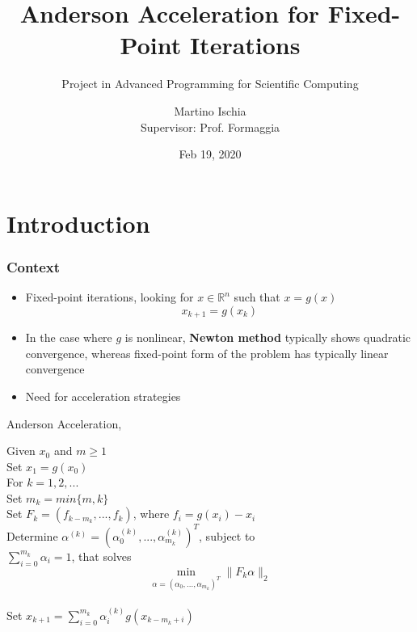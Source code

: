 \documentclass{beamer}
\title[Anderson Acceleration]{Anderson Acceleration for Fixed-Point Iterations}
\subtitle {Project in Advanced Programming for Scientific Computing}
\author[Martino Ischia]{Martino Ischia\\ \footnotesize{Supervisor: Prof. Formaggia}}
\institute[]
		{
		Politecnico di Milano
		}
\date{Feb 19, 2020}
\begin{document}
			\begin{frame}
				\titlepage 
			\end{frame}
				
			\section{Introduction}
				\begin{frame}
					\frametitle{Context}
					\begin{itemize}
						\item Fixed-point iterations, looking for $x\in\mathbb{R}^n$ such that $x=g(x)$
						$$x_{k+1} = g(x_k)$$
						\item In the case where $g$ is nonlinear, \textbf{Newton method} typically shows quadratic convergence,
						whereas fixed-point form of the problem has typically linear convergence
						\item  Need for acceleration strategies
					\end{itemize}    
				\end{frame}
				
				
				\begin{frame}{Anderson Acceleration, \citeyear{Anderson} \cite{Anderson}}
					
					Given $x_0$ and $m \geq 1$\\
					Set $x_1 = g(x_0)$\\
					For $k = 1, 2, ...$\\
					\hspace*{16pt} Set $m_k = min\{m, k\}$\\
					\hspace*{20pt}Set $F_k = (f_{k-m_k}, ... , f_k)$, where $f_i = g(x_i)-x_{i}$\\
					\hspace*{20pt}Determine $\alpha^{(k)} = (\alpha^{(k)}
					_0 , ..., \alpha^{(k)}_{m_k} )^T$, subject to\\ \hspace*{20pt}$\sum^{m_k}_{i=0} {\alpha_i = 1}$, that solves
					$$\min_{\alpha=(\alpha_0,...,\alpha_{m_k} )^T} \|F_k \alpha\|_2$$\\
					\hspace*{20pt}Set $x_{k+1} =\sum^{m_k}
					_{i=0} {\alpha_i^{(k)} g(x_{k-m_{k}+i})}$    
				\end{frame}
				
\end{document}
